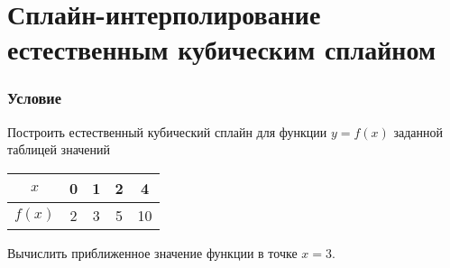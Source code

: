 \documentclass[a4paper, 12pt]{article}
\begin{document}
	\section*{Сплайн-интерполирование естественным кубическим сплайном}
	\subsubsection*{Условие}
	Построить естественный кубический сплайн для функции $y = f(x)$ заданной таблицей значений 
	\begin{center}\begin{tabular}[t]{|c|c|c|c|c|}
			\hline
			$x$ & 0 & 1 & 2 & 4 \\
			\hline
			$f(x)$ & 2 & 3 & 5 & 10 \\
			\hline
	\end{tabular}\end{center}
	Вычислить приближенное значение функции в точке $x=3$.
\end{document}

